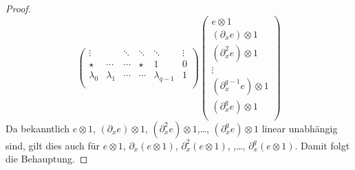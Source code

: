 \begin{proof}
\[\begin{pmatrix}
\vdots    &           & \ddots & \ddots & \ddots        & \vdots\\
\star     & \cdots    & \cdots & \star  & 1             & 0\\
\lambda_0 & \lambda_1 & \cdots & \cdots & \lambda_{q-1} & 1\\
\end{pmatrix}
\begin{pmatrix}
e\otimes 1\\
(\partial_xe)\otimes 1\\
(\partial_x^{2}e)\otimes 1\\
\vdots\\
(\partial_x^{q-1}e)\otimes 1\\
(\partial_x^{q}e)\otimes 1\\
\end{pmatrix}
\]
Da bekanntlich $e\otimes1$, $(\partial_xe)\otimes 1$, $(\partial_x^{2}e)\otimes
1$,\dots, $(\partial_x^{q}e)\otimes 1$ linear unabhängig sind, gilt dies auch
für $e\otimes 1$, $\partial_x(e\otimes 1)$, $\partial_x^2(e\otimes 1)$, ,\dots,
$\partial_x^{q}(e\otimes 1)$. Damit folgt die Behauptung.
\end{proof}
\begin{comment}
\begin{lem}
\cite[Seite 44]{DiplHedwig}
Wenn $\rho^+\cM_\phi=\cD_{\hat K}/\cD_{\hat
K}\cdot(\rho^*P_{\phi}(x,\partial_x))$ gilt, so ist
\begin{align*}
\cN\bydef\rho^+\cM_\phi\otimes\sE_{\hat K}^\psi
  &=\cD_{\hat K}/\cD_{\hat
    K}\cdot(\rho^*P_{\phi}(x,\partial_x+\frac{\beta}{x^{\lambda+1}}))\\
  &=\cD_{\hat K}/\cD_{\hat
    K}\cdot(\rho^*P_{\phi}(x,\partial_x+\frac{\beta}{x^{\lambda+1}}))
\end{align*}
\end{lem}
\end{comment}

